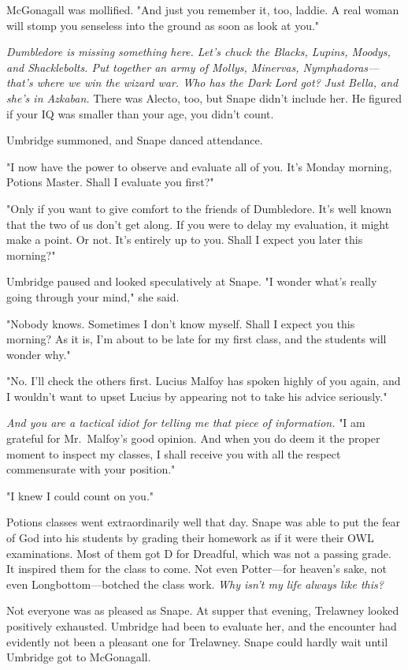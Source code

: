 McGonagall was mollified. "And just you remember it, too, laddie. A real woman will stomp you senseless into the ground as soon as look at you."

\emph{Dumbledore is missing something here. Let's chuck the Blacks, Lupins, Moodys, and Shacklebolts. Put together an army of Mollys, Minervas, Nymphadoras—that's where we win the wizard war. Who has the Dark Lord got? Just Bella, and she's in Azkaban.} There was Alecto, too, but Snape didn't include her. He figured if your IQ was smaller than your age, you didn't count.

Umbridge summoned, and Snape danced attendance.

"I now have the power to observe and evaluate all of you. It's Monday morning, Potions Master. Shall I evaluate you first?"

"Only if you want to give comfort to the friends of Dumbledore. It's well known that the two of us don't get along. If you were to delay my evaluation, it might make a point. Or not. It's entirely up to you. Shall I expect you later this morning?"

Umbridge paused and looked speculatively at Snape. "I wonder what's really going through your mind," she said.

"Nobody knows. Sometimes I don't know myself. Shall I expect you this morning? As it is, I'm about to be late for my first class, and the students will wonder why."

"No. I'll check the others first. Lucius Malfoy has spoken highly of you again, and I wouldn't want to upset Lucius by appearing not to take his advice seriously."

\emph{And you are a tactical idiot for telling me that piece of information.} "I am grateful for Mr.~Malfoy's good opinion. And when you do deem it the proper moment to inspect my classes, I shall receive you with all the respect commensurate with your position."

"I knew I could count on you."

Potions classes went extraordinarily well that day. Snape was able to put the fear of God into his students by grading their homework as if it were their OWL examinations. Most of them got D for Dreadful, which was not a passing grade. It inspired them for the class to come. Not even Potter—for heaven's sake, not even Longbottom—botched the class work. \emph{Why isn't my life always like this?}

Not everyone was as pleased as Snape. At supper that evening, Trelawney looked positively exhausted. Umbridge had been to evaluate her, and the encounter had evidently not been a pleasant one for Trelawney. Snape could hardly wait until Umbridge got to McGonagall.

